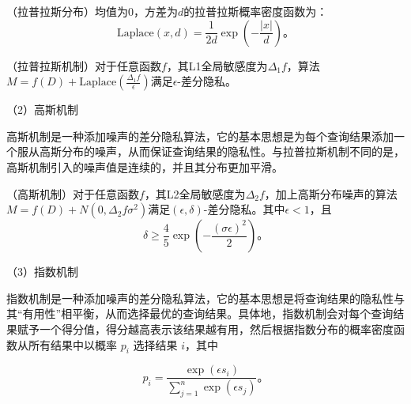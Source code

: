 \begin{definition}
	（拉普拉斯分布）均值为0，方差为$d$的拉普拉斯概率密度函数为：
	\begin{equation}
		\text{Laplace}(x, d)=\frac{1}{2d}\exp\left(-\frac{|x|}{d}\right)\text{。}
	\end{equation}
\end{definition}

\begin{theorem}
	（拉普拉斯机制\cite{dwork2006calibrating}）对于任意函数$f$，其L1全局敏感度为$\Delta_1f$，算法$M=f(D)+\text{Laplace}(\frac{\Delta_1f}{\epsilon})$满足$\epsilon$-差分隐私。
\end{theorem}

（2）高斯机制

高斯机制是一种添加噪声的差分隐私算法，它的基本思想是为每个查询结果添加一个服从高斯分布的噪声，从而保证查询结果的隐私性。与拉普拉斯机制不同的是，高斯机制引入的噪声值是连续的，并且其分布更加平滑。


\begin{theorem}
	（高斯机制\cite{Algorithmic_Foundations_of_DP}）对于任意函数$f$，其L2全局敏感度为$\Delta_2f$，加上高斯分布噪声的算法$M=f(D)+N(0,\Delta_2f\sigma^2)$满足$(\epsilon, \delta)$-差分隐私。其中$\epsilon<1$，且
	$$\delta\geq \frac{4}{5}\exp\left(-\frac{(\sigma\epsilon)^2}{2}\right)\text{。}$$
\end{theorem}

%
%

（3）指数机制

指数机制是一种添加噪声的差分隐私算法，它的基本思想是将查询结果的隐私性与其“有用性”相平衡，从而选择最优的查询结果。具体地，指数机制会对每个查询结果赋予一个得分值，得分越高表示该结果越有用，然后根据指数分布的概率密度函数从所有结果中以概率 $p_i$ 选择结果 $i$，其中

$$ p_i = \frac{\exp(\epsilon s_i)}{\sum_{j=1}^{n}\exp(\epsilon s_j)} \text{。}$$

